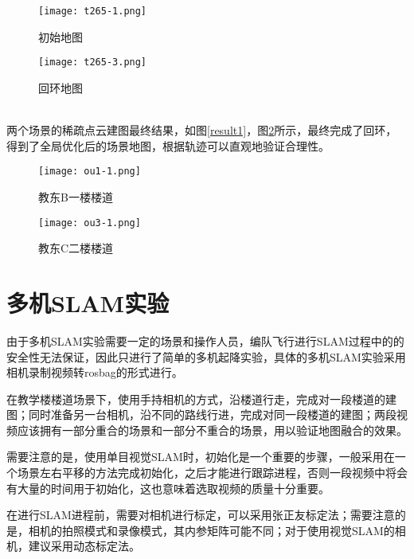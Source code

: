 \begin{figure}[htbp]
	\centering
	\begin{minipage}[t]{0.4\columnwidth} %
		\centering
		\texttt{[image: t265-1.png]}
		\caption{初始地图}
		\label{fig-camera1}
	\end{minipage}
	\begin{minipage}[t]{0.4\columnwidth}
		\centering
		\texttt{[image: t265-3.png]}
		\caption{回环地图}
		\label{fig-camera2}
	\end{minipage}
\end{figure}
~\\
两个场景的稀疏点云建图最终结果，如图\ref{result1}，图\ref{result2}所示，最终完成了回环，得到了全局优化后的场景地图，根据轨迹可以直观地验证合理性。

\begin{figure}[htbp]
	\centering
	\begin{minipage}[t]{0.45\columnwidth} %
		\centering
		\texttt{[image: ou1-1.png]}
		\caption{教东B一楼楼道}
		\label{result1}
	\end{minipage}
	\begin{minipage}[t]{0.45\columnwidth}
		\centering
		\texttt{[image: ou3-1.png]}
		\caption{教东C二楼楼道}
		\label{result2}
	\end{minipage}
\end{figure}


\section{多机SLAM实验}

由于多机SLAM实验需要一定的场景和操作人员，编队飞行进行SLAM过程中的的安全性无法保证，因此只进行了简单的多机起降实验，具体的多机SLAM实验采用相机录制视频转rosbag的形式进行。

在教学楼楼道场景下，使用手持相机的方式，沿楼道行走，完成对一段楼道的建图；同时准备另一台相机，沿不同的路线行进，完成对同一段楼道的建图；两段视频应该拥有一部分重合的场景和一部分不重合的场景，用以验证地图融合的效果。

需要注意的是，使用单目视觉SLAM时，初始化是一个重要的步骤，一般采用在一个场景左右平移的方法完成初始化，之后才能进行跟踪进程，否则一段视频中将会有大量的时间用于初始化，这也意味着选取视频的质量十分重要。

在进行SLAM进程前，需要对相机进行标定，可以采用张正友标定法；需要注意的是，相机的拍照模式和录像模式，其内参矩阵可能不同；对于使用视觉SLAM的相机，建议采用动态标定法。

